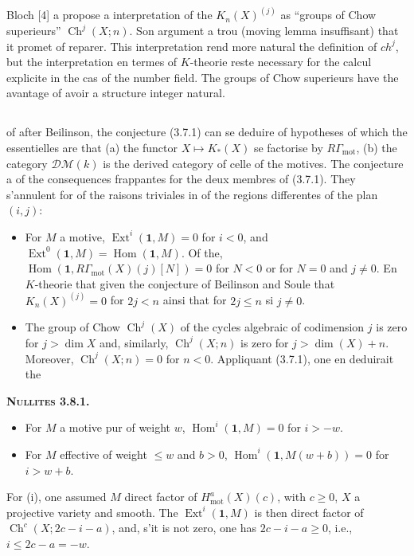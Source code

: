 \documentclass[11pt,a4paper]{article}
\theoremstyle{plain}
\theoremstyle{definition}
\DeclareMathOperator{\Ext}{Ext}
\DeclareMathOperator{\Hom}{Hom}
\DeclareMathOperator{\Ch}{Ch}
\DeclareMathOperator{\mot}{mot}
\begin{document}
Bloch [4] a propose a interpretation of the $K_n(X)^{(j)}$ as ``groups of Chow superieurs'' $\Ch^j(X; n)$. Son argument a trou (moving lemma insuffisant) that it promet of reparer. This interpretation rend more natural the definition of $ch^j$, but the interpretation en termes of $K$-theorie reste necessary for the calcul explicite in the cas of the number field. The groups of Chow superieurs have the avantage of avoir a structure integer natural.

\subsection{}

of after Beilinson, the conjecture (3.7.1) can se deduire of hypotheses of which the essentielles are that (a) the functor $X \mapsto K_*(X)$ se factorise by $R\Gamma_{\mot}$, (b) the category $\mathscr{D}\mathcal{M}(k)$ is the derived category of celle of the motives. The conjecture a of the consequences frappantes for the deux membres of (3.7.1). They s'annulent for of the raisons triviales in of the regions differentes of the plan $(i, j)$:

\begin{itemize}
\item[(a)] For $M$ a motive, $\Ext^i(\mathbf{1}, M) = 0$ for $i < 0$, and $\Ext^0(\mathbf{1}, M) = \Hom(\mathbf{1}, M)$. Of the, $\Hom(\mathbf{1}, R\Gamma_{\mot}(X)(j)[N]) = 0$ for $N < 0$ or for $N = 0$ and $j \neq 0$. En $K$-theorie that given the conjecture of Beilinson and Soule that $K_n(X)^{(j)} = 0$ for $2j < n$ ainsi that for $2j \leq n$ si $j \neq 0$.

\item[(b)] The group of Chow $\Ch^j(X)$ of the cycles algebraic of codimension $j$ is zero for $j > \dim X$ and, similarly, $\Ch^j(X; n)$ is zero for $j > \dim(X) + n$. Moreover, $\Ch^j(X; n) = 0$ for $n < 0$. Appliquant (3.7.1), one en deduirait the
\end{itemize}

\textbf{\textsc{Nullites 3.8.1.}}
\begin{itemize}
\item[(i)] For $M$ a motive pur of weight $w$, $\Hom^i(\mathbf{1}, M) = 0$ for $i > -w$.
\item[(ii)] For $M$ effective of weight $\leq w$ and $b > 0$, $\Hom^i(\mathbf{1}, M(w+b)) = 0$ for $i > w + b$.
\end{itemize}

For (i), one assumed $M$ direct factor of $H^a_{\mot}(X)(c)$, with $c \geq 0$, $X$ a projective variety and smooth. The $\Ext^i(\mathbf{1}, M)$ is then direct factor of $\Ch^c(X; 2c-i-a)$, and, s'it is not zero, one has $2c - i - a \geq 0$, i.e., $i \leq 2c - a = -w$.
\end{document}
